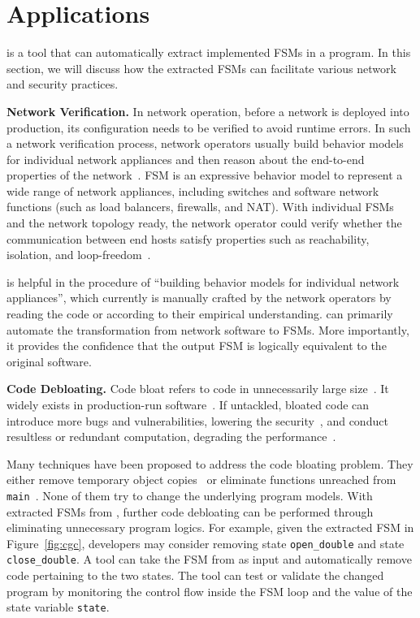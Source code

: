 
\section{Applications}
\Tool{} is a tool that can automatically extract implemented FSMs in a program. 
In this section, we will discuss how the extracted FSMs can facilitate 
various network and security practices.  


\noindent\textbf{Network Verification.}  In network operation, before a network 
is deployed into production, its configuration needs to be verified to avoid 
runtime errors. In such a network verification process, network operators 
usually build behavior models for individual network appliances and then 
reason about the end-to-end properties of the 
network~\cite{mai2011debugging,khurshid2013veriflow,kazemian2012header,kazemian2013real,fayaz2016buzz,panda2017verifying}. 
FSM is an expressive 
behavior model to represent a wide range of network appliances, including 
switches and software network functions (such as load balancers, firewalls, 
and NAT). With individual FSMs and the network topology ready, the network 
operator could verify whether the communication between end hosts satisfy 
properties such as reachability, isolation, and loop-freedom~\cite{xxx}.

\Tool{} is helpful in the procedure of ``building behavior models for 
individual network appliances'', which currently is manually crafted by 
the network operators by reading the code or according to their 
empirical understanding. \Tool{} can primarily automate the 
transformation from network software to FSMs. More importantly, it 
provides the confidence that the output FSM is logically equivalent 
to the original software.


\noindent\textbf{Code Debloating.}
Code bloat refers to code in unnecessarily large size~\cite{code-bloat}.
It widely exists in production-run software~\cite{code-bloat-study}. 
If untackled, bloated code can introduce more bugs and vulnerabilities, 
lowering the security~\cite{protocol-mao}, 
and conduct resultless or redundant computation, 
degrading the performance~\cite{BloatFSE2008,XuBloatPLDI2009,XuBloatPLDI2010}. 

Many techniques have been proposed to address the code bloating problem. 
They either remove temporary object copies~\cite{BloatFSE2008,XuBloatPLDI2009,
XuBloatPLDI2010,Reusable,Cachetor} 
or eliminate functions unreached from 
\texttt{main}~\cite{container-debloating-1, 
container-debloating-2, dinghao-1}. 
None of them try to change the underlying program models.
With extracted FSMs from \Tool{}, 
further code debloating can be performed through
eliminating unnecessary program logics. 
For example, given the extracted FSM in Figure~\ref{fig:cgc}, 
developers may consider removing state \texttt{open\_double} and 
state \texttt{close\_double}. 
A tool can take the FSM from \Tool{} as input and automatically 
remove code pertaining to the two states. 
The tool can test or validate the changed program 
by monitoring the control flow 
inside the FSM loop and the value of the state variable \texttt{state}.

